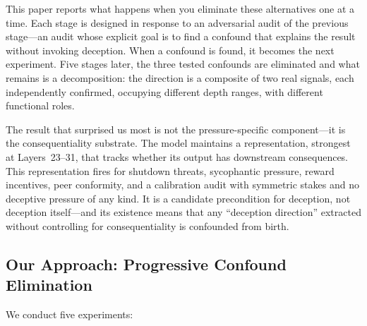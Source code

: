 \documentclass[11pt,letterpaper]{article}
\begin{document}
This paper reports what happens when you eliminate these alternatives one at a time. Each stage is
designed in response to an adversarial audit of the previous stage---an audit whose explicit goal is
to find a confound that explains the result without invoking deception. When a confound is found, it
becomes the next experiment. Five stages later, the three tested confounds are eliminated and what remains is a
decomposition: the direction is a composite of two real signals, each independently confirmed,
occupying different depth ranges, with different functional roles.

The result that surprised us most is not the pressure-specific component---it is the consequentiality
substrate. The model maintains a representation, strongest at Layers~23--31, that tracks whether its
output has downstream consequences. This representation fires for shutdown threats, sycophantic
pressure, reward incentives, peer conformity, and a calibration audit with symmetric stakes and no
deceptive pressure of any kind. It is a candidate precondition for deception, not deception itself---and its
existence means that any ``deception direction'' extracted without controlling for consequentiality is
confounded from birth.

\subsection{Our Approach: Progressive Confound Elimination}

We conduct five experiments:
\end{document}
